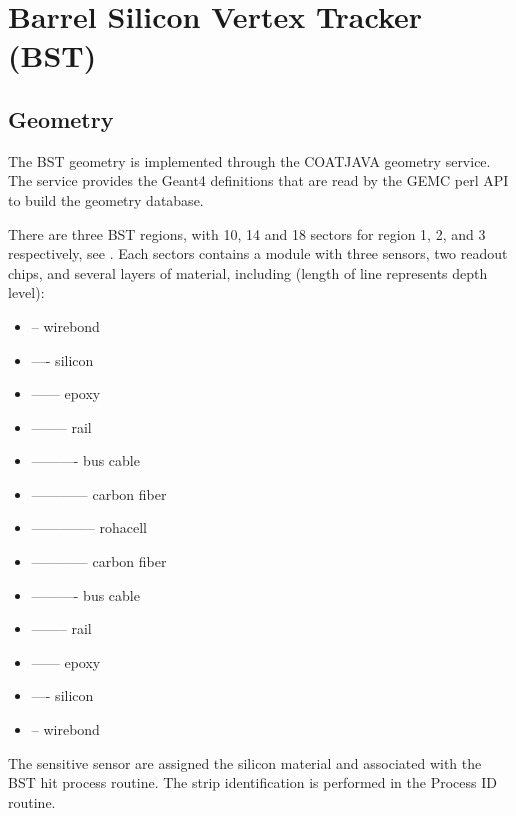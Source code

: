 \section{Barrel Silicon Vertex Tracker (BST)}


\subsection{Geometry}


The BST geometry is implemented through the COATJAVA geometry service.
The service provides the Geant4 definitions that are read by the GEMC perl API to build the geometry database.

There are three BST regions, with 10, 14 and 18 sectors for region 1, 2, and 3 respectively, see .
Each sectors contains a module with three sensors, two readout chips, and several layers of material,
including (length of line represents depth level):

\begin{itemize}
	\item -- wirebond
	\item ---- silicon
	\item ------ epoxy
	\item -------- rail
	\item ---------- bus cable
	\item ------------ carbon fiber
	\item -------------- rohacell
	\item ------------ carbon fiber
	\item ---------- bus cable
	\item -------- rail
	\item ------ epoxy
	\item ---- silicon
	\item -- wirebond
\end{itemize}

The sensitive sensor are assigned the silicon material and associated with the BST hit process routine.
The strip identification is performed in the Process ID routine.

